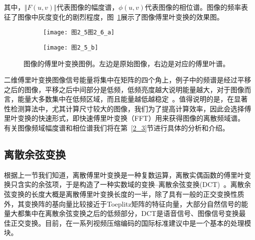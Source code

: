 其中，$\Vert F(u,v)\Vert$代表图像的幅度谱，$\phi(u,v)$代表图像的相位谱。图像的频率表征了图像中灰度变化的剧烈程度，图~\ref{图2_5}展示了图像傅里叶变换的效果图。
\begin{figure}[t]
  \centering%
  \begin{subfigure}{3cm}
    \texttt{[image: 图2\_5图2\_6\_a]}
  \end{subfigure}
  \hspace{4em}%
  \begin{subfigure}{0.25\textwidth}
    \texttt{[image: 图2\_5\_b]}
  \end{subfigure}
  \caption{图像的傅里叶变换图例。左边是原始图像，右边是对应的傅里叶谱。}
  \label{图2_5} 
\end{figure}

二维傅里叶变换图像信号能量将集中在矩阵的四个角上，例子中的频谱是经过平移之后的图像，平移之后中间部分是低频，低频亮度越大说明能量越大，对于图像而言，能量大多数集中在低频区域，而且能量越低越稳定~\cite{Gonzalez2005book}。值得说明的是，在显著性检测算法中，尤其计算尺寸较大的图像，我们为了提高计算效率，因此会选择傅里叶变换的快速形式，即快速傅里叶变换（FFT）用来获得图像的离散频域谱。有关图像频域幅度谱和相位谱我们将在第~\ref{2_3}节进行具体的分析和介绍。

\subsection{离散余弦变换}
\label{2_2_2}

根据上一节我们知道，离散傅里叶变换是一种复数运算，离散实偶函数的傅里叶变换只含实的余弦项，于是构造了一种实数域的变换--离散余弦变换(DCT)~\cite{Rao2014book}。离散余弦变换的长度大概是离散傅里叶变换长度的一半，除了具有一般的正交变换性质外，其变换阵的基向量比较接近于Toeplitz矩阵的特征向量，大部分自然信号的能量大都集中在离散余弦变换之后的低频部分，DCT是语音信号、图像信号变换最佳正交变换。目前，在一系列视频压缩编码的国际标准建议中是一个基本的处理模块。


